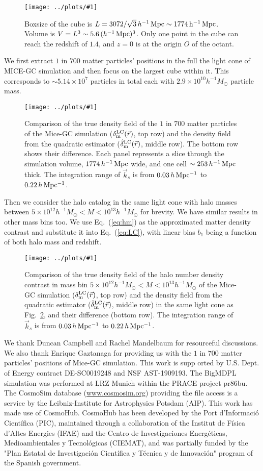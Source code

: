 \documentclass[prd,amsmath,amssymb,floatfix,superscriptaddress,nofootinbib,twocolumn]{revtex4-1}
\newcommand{\vrr}{\vec{r}}
\newcommand{\vk}{\vec{k}}
\newcommand{\ec}[1]{Eq.~(\ref{eq:#1})}
\newcommand{\rf}[1]{\ref{fig:#1}}
\newcommand{\sfig}[2]{
\texttt{[image: ../plots/\#1]}
        }
\newcommand{\Sfig}[2]{
   \begin{figure}[thbp]
   \begin{center}
    \sfig{../plots/#1.pdf}{\columnwidth}
    \caption{{\small #2}}
    \label{fig:#1}
     \end{center}
   \end{figure}
}
\begin{document}
\Sfig{Cube}{Boxsize of the cube is $L=3072/\sqrt{3}\, h^{-1}\, \rm Mpc\sim 1774\, h^{-1}\, \rm Mpc$. Volume is $V=L^3\sim 5.6\,(h^{-1}\,\rm Mpc)^3$. Only one point in the cube can reach the redshift of $1.4$, and $z=0$ is at the origin $O$ of the octant.}

We first extract $1$ in $700$  matter particles' positions in the full the light cone of MICE-GC simulation and then focus on the largest cube within it. This corresponds to $\sim 5.14\times 10^{7}$ particles in total each with $2.9\times 10^{10} h^{-1}M_{\odot}$ particle mass. 

\Sfig{real_dm}{Comparison of the true density field of the $1$ in $700$ matter particles of the Mice-GC simulation ($\delta^{\rm LC}_{\rm m}(\vrr)$, top row) and the density field from the quadratic estimator ($\hat{\delta}_{\rm m}^{\rm LC}(\vrr)$, middle row). The bottom row shows their difference. Each panel represents a slice through the simulation volume, $1774\,h^{-1}\rm \, Mpc$ wide, and one cell $\sim 253\,h^{-1}\rm \, Mpc$ thick. The integration range of $\vk_{s}$ is from $0.03\, h \rm \, Mpc^{-1}$ to $0.22\, h \rm \, Mpc^{-1}$.}

Then we consider the halo catalog in the same light cone with halo masses between $5 \times 10^{12}h^{-1}M_{\odot}<M < 10^{13}h^{-1}M_{\odot}$ for brevity. We have similar results in other mass bins too. We use \ec{hm} as the approximated matter density contrast and substitute it into \ec{LC}, with linear bias $b_{1}$ being a function of both halo mass and redshift. 

\Sfig{real_halo}{Comparison of the true density field of the halo number density contrast in mass bin $5 \times 10^{12}h^{-1}M_{\odot}<M < 10^{13}h^{-1}M_{\odot}$ of the Mice-GC simulation ($\delta^{\rm LC}_{\rm m}(\vrr)$, top row) and the density field from the quadratic estimator ($\hat{\delta}_{\rm m}^{\rm LC}(\vrr)$, middle row) in the same light cone as Fig.~\rf{real_dm}, and their difference (bottom row). The integration range of $\vk_{s}$ is from $0.03\, h \rm \, Mpc^{-1}$ to $0.22\, h \rm \, Mpc^{-1}$.} 


\acknowledgements
We thank Duncan Campbell and Rachel Mandelbaum for resourceful discussions. We also thank Enrique Gaztanaga for providing us with the $1$ in $700$ matter particles' positions of Mice-GC simulation. This work is supp orted by U.S. Dept. of Energy contract DE-SC0019248 and NSF AST-1909193.
The BigMDPL simulation was performed at LRZ Munich within the PRACE project pr86bu. The CosmoSim database (\url{www.cosmosim.org}) providing the file access is a service by the Leibniz-Institute for Astrophysics Potsdam (AIP).
This work has made use of CosmoHub. CosmoHub has been developed by the Port d'Informació Científica (PIC), maintained through a collaboration of the Institut de Física d'Altes Energies (IFAE) and the Centro de Investigaciones Energéticas, Medioambientales y Tecnológicas (CIEMAT), and was partially funded by the "Plan Estatal de Investigación Científica y Técnica y de Innovación" program of the Spanish government.
\clearpage

\end{document}
